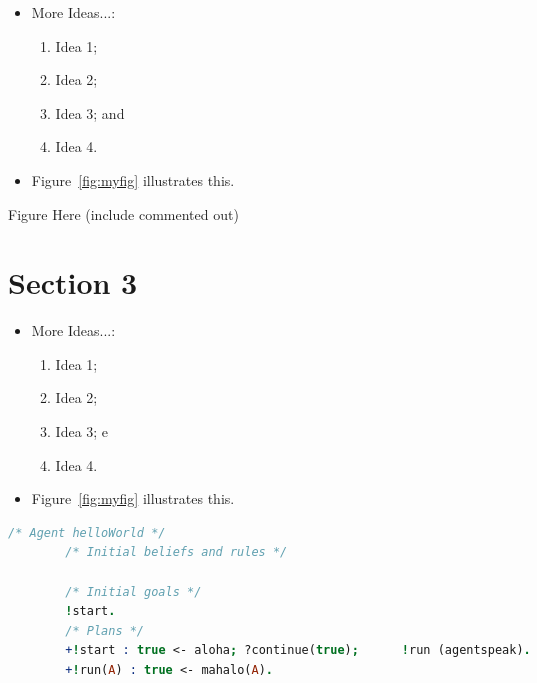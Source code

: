 \documentclass[a0,portrait]{lab-poster}
\begin{document}
\begin{multicols}{2}
\vspace{13mm}


\begin{itemize}
	\item More Ideas...:
	\begin{enumerate}
		\item Idea 1;
		\item Idea 2; 
		\item Idea 3; and
		\item Idea 4.
	\end{enumerate}	
	\item Figure~\ref{fig:myfig} illustrates this.
\end{itemize}
\vspace{13mm}

\begin{center}
	\Huge Figure Here (include commented out)
	\label{fig:myfig}
\end{center}	


\section*{Section 3}

\begin{itemize}
	\item More Ideas...:
	\begin{enumerate}
		\item Idea 1;
		\item Idea 2; 
		\item Idea 3; e
		\item Idea 4.
	\end{enumerate}	
	\item Figure~\ref{fig:myfig} illustrates this.
\end{itemize}


\vspace{13mm}
\noindent\begin{minipage}{.235\textwidth}
	\begin{minipage}{\textwidth}
		\lstset{style=codeStyle}
		\begin{lstlisting}[language=Prolog, label={alg:example-hello-world}, caption={AgentSpeak(L) programme example.}]
		/* Agent helloWorld */
		/* Initial beliefs and rules */
		
		/* Initial goals */			
		!start.
		/* Plans */
		+!start : true <- aloha; ?continue(true);      !run (agentspeak).
		+!run(A) : true <- mahalo(A).
		\end{lstlisting}
	\end{minipage}\hfill
	\vspace{7mm}
	

\end{minipage}
\end{multicols}
\end{document}
